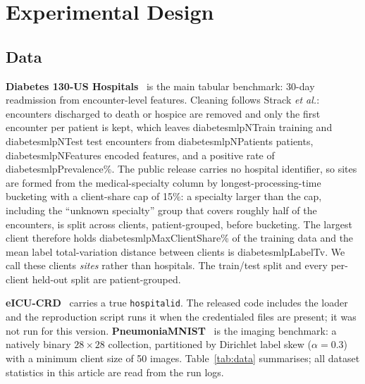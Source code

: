 \section{Experimental Design}
\label{sec:setup}

\subsection{Data}
\textbf{Diabetes 130-US Hospitals}~\cite{strack2014} is the main tabular benchmark: 30-day readmission from encounter-level features. Cleaning follows Strack \emph{et al.}: encounters discharged to death or hospice are removed and only the first encounter per patient is kept, which leaves \num{diabetesmlpNTrain} training and \num{diabetesmlpNTest} test encounters from \num{diabetesmlpNPatients} patients, \num{diabetesmlpNFeatures} encoded features, and a positive rate of \num{diabetesmlpPrevalence}\%. The public release carries no hospital identifier, so sites are formed from the medical-specialty column by longest-processing-time bucketing with a client-share cap of 15\%: a specialty larger than the cap, including the ``unknown specialty'' group that covers roughly half of the encounters, is split across clients, patient-grouped, before bucketing. The largest client therefore holds \num{diabetesmlpMaxClientShare}\% of the training data and the mean label total-variation distance between clients is \num{diabetesmlpLabelTv}. We call these clients \emph{sites} rather than hospitals. The train/test split and every per-client held-out split are patient-grouped.

\textbf{eICU-CRD}~\cite{pollard2018} carries a true \texttt{hospitalid}. The released code includes the loader and the reproduction script runs it when the credentialed files are present; it was not run for this version. \textbf{PneumoniaMNIST}~\cite{yang2023medmnist} is the imaging benchmark: a natively binary $28\times28$ collection, partitioned by Dirichlet label skew ($\alpha=0.3$) with a minimum client size of 50 images. Table~\ref{tab:data} summarises; all dataset statistics in this article are read from the run logs.

